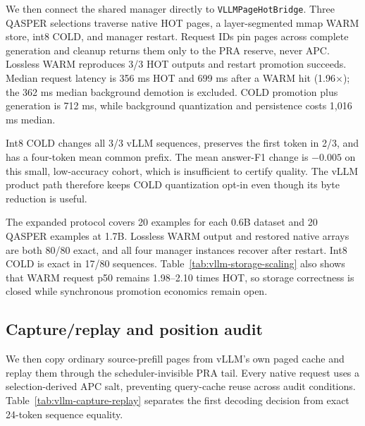 \documentclass[10pt]{article}
\begin{document}
We then connect the shared manager directly to
\texttt{VLLMPageHotBridge}. Three QASPER selections traverse native HOT pages,
a layer-segmented mmap WARM store, int8 COLD, and manager restart. Request IDs
pin pages across complete generation and cleanup returns them only to the PRA
reserve, never APC. Lossless WARM reproduces 3/3 HOT outputs and restart
promotion succeeds. Median request latency is 356 ms HOT and 699 ms after a
WARM hit (1.96$\times$); the 362 ms median background demotion is excluded.
COLD promotion plus generation is 712 ms, while background quantization and
persistence costs 1,016 ms median.

\begin{table}[t]
\centering
\scriptsize
\caption{Shared three-example live storage probe. WARM is lossless; COLD uses
explicit per-array int8 and is not the default product profile.}
\resizebox{\linewidth}{!}{%
}
\label{tab:vllm-live-storage}
\end{table}

Int8 COLD changes all 3/3 vLLM sequences, preserves the first token in 2/3,
and has a four-token mean common prefix. The mean answer-F1 change is $-0.005$
on this small, low-accuracy cohort, which is insufficient to certify quality.
The vLLM product path therefore keeps COLD quantization opt-in even though its
byte reduction is useful.

The expanded protocol covers 20 examples for each 0.6B dataset and 20 QASPER
examples at 1.7B. Lossless WARM output and restored native arrays are both
80/80 exact, and all four manager instances recover after restart. Int8 COLD
is exact in 17/80 sequences. Table~\ref{tab:vllm-storage-scaling} also shows
that WARM request p50 remains 1.98--2.10 times HOT, so storage correctness is
closed while synchronous promotion economics remain open.

\begin{table}[t]
\centering
\scriptsize
\caption{Expanded vLLM-Metal lifecycle cohorts. p50/p95 include promotion and
generation; int8 is diagnostic.}
\resizebox{\linewidth}{!}{%
}
\label{tab:vllm-storage-scaling}
\end{table}

\subsection{Capture/replay and position audit}
We then copy ordinary source-prefill pages from vLLM's own paged cache and
replay them through the scheduler-invisible PRA tail. Every native request uses
a selection-derived APC salt, preventing query-cache reuse across audit
conditions. Table~\ref{tab:vllm-capture-replay} separates the first decoding
decision from exact 24-token sequence equality.
\end{document}
